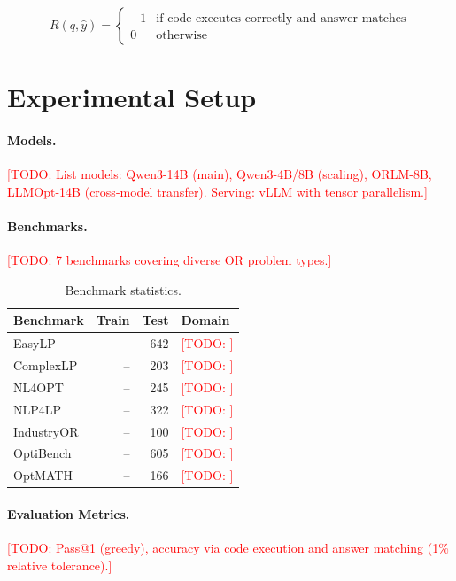 \documentclass[11pt]{article}
\newcommand{\todo}[1]{\textcolor{red}{[TODO: #1]}}
\begin{document}
\begin{equation}
    R(q, \hat{y}) = \begin{cases}
        +1 & \text{if code executes correctly and answer matches} \\
        0 & \text{otherwise}
    \end{cases}
\end{equation}

\section{Experimental Setup}
\label{sec:setup}

\paragraph{Models.}
\todo{List models: Qwen3-14B (main), Qwen3-4B/8B (scaling), ORLM-8B, LLMOpt-14B (cross-model transfer). Serving: vLLM with tensor parallelism.}

\paragraph{Benchmarks.}
\todo{7 benchmarks covering diverse OR problem types.}

\begin{table}[t]
\centering
\caption{Benchmark statistics.}
\label{tab:benchmarks}
\small
\begin{tabular}{@{}lrrl@{}}
\toprule
\textbf{Benchmark} & \textbf{Train} & \textbf{Test} & \textbf{Domain} \\
\midrule
EasyLP     & -- & 642 & \todo{} \\
ComplexLP  & -- & 203 & \todo{} \\
NL4OPT    & -- & 245 & \todo{} \\
NLP4LP    & -- & 322 & \todo{} \\
IndustryOR & -- & 100 & \todo{} \\
OptiBench  & -- & 605 & \todo{} \\
OptMATH   & -- & 166 & \todo{} \\
\bottomrule
\end{tabular}
\end{table}

\paragraph{Evaluation Metrics.}
\todo{Pass@1 (greedy), accuracy via code execution and answer matching (1\% relative tolerance).}
\end{document}
